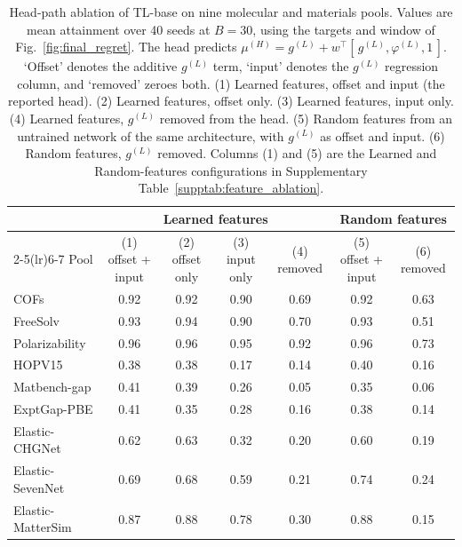 \begin{table}[p]
\centering
\scriptsize
\caption{Head-path ablation of TL-base on nine molecular and materials pools. Values are mean attainment over 40 seeds at $B = 30$, using the targets and window of Fig.~\ref{fig:final_regret}. The head predicts $\mu^{(H)} = g^{(L)} + w^{\top}[\,g^{(L)}, \varphi^{(L)}, 1\,]$. `Offset' denotes the additive $g^{(L)}$ term, `input' denotes the $g^{(L)}$ regression column, and `removed' zeroes both. (1) Learned features, offset and input (the reported head). (2) Learned features, offset only. (3) Learned features, input only. (4) Learned features, $g^{(L)}$ removed from the head. (5) Random features from an untrained network of the same architecture, with $g^{(L)}$ as offset and input. (6) Random features, $g^{(L)}$ removed. Columns (1) and (5) are the Learned and Random-features configurations in Supplementary Table~\ref{supptab:feature_ablation}.}
\label{supptab:head_path}
\setlength{\tabcolsep}{3pt}%
\begin{tabular}{@{}lcccccc@{}}
\toprule
 & \multicolumn{4}{c}{Learned features} & \multicolumn{2}{c}{Random features} \\
\cmidrule(lr){2-5}\cmidrule(lr){6-7}
Pool & (1) offset + input & (2) offset only & (3) input only & (4) removed & (5) offset + input & (6) removed \\
\midrule
COFs & 0.92 & 0.92 & 0.90 & 0.69 & 0.92 & 0.63 \\
FreeSolv & 0.93 & 0.94 & 0.90 & 0.70 & 0.93 & 0.51 \\
Polarizability & 0.96 & 0.96 & 0.95 & 0.92 & 0.96 & 0.73 \\
HOPV15 & 0.38 & 0.38 & 0.17 & 0.14 & 0.40 & 0.16 \\
Matbench-gap & 0.41 & 0.39 & 0.26 & 0.05 & 0.35 & 0.06 \\
ExptGap-PBE & 0.41 & 0.35 & 0.28 & 0.16 & 0.38 & 0.14 \\
Elastic-CHGNet & 0.62 & 0.63 & 0.32 & 0.20 & 0.60 & 0.19 \\
Elastic-SevenNet & 0.69 & 0.68 & 0.59 & 0.21 & 0.74 & 0.24 \\
Elastic-MatterSim & 0.87 & 0.88 & 0.78 & 0.30 & 0.88 & 0.15 \\
\bottomrule
\end{tabular}
\end{table}

